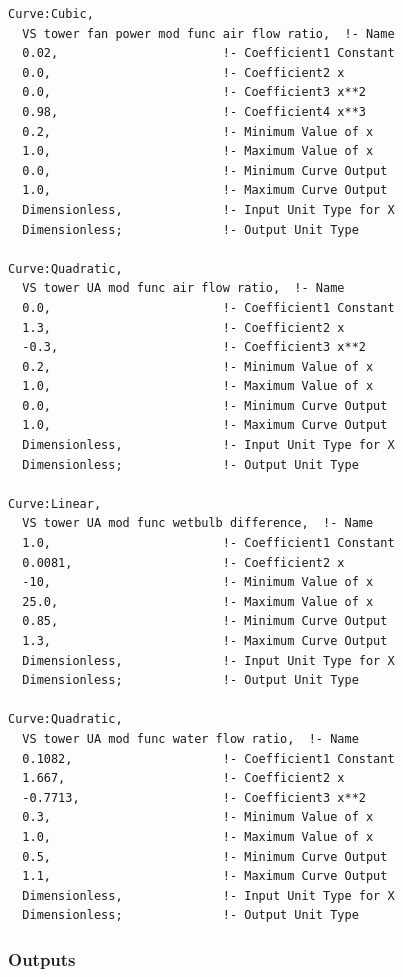 \begin{lstlisting}
Curve:Cubic,
  VS tower fan power mod func air flow ratio,  !- Name
  0.02,                       !- Coefficient1 Constant
  0.0,                        !- Coefficient2 x
  0.0,                        !- Coefficient3 x**2
  0.98,                       !- Coefficient4 x**3
  0.2,                        !- Minimum Value of x
  1.0,                        !- Maximum Value of x
  0.0,                        !- Minimum Curve Output
  1.0,                        !- Maximum Curve Output
  Dimensionless,              !- Input Unit Type for X
  Dimensionless;              !- Output Unit Type

Curve:Quadratic,
  VS tower UA mod func air flow ratio,  !- Name
  0.0,                        !- Coefficient1 Constant
  1.3,                        !- Coefficient2 x
  -0.3,                       !- Coefficient3 x**2
  0.2,                        !- Minimum Value of x
  1.0,                        !- Maximum Value of x
  0.0,                        !- Minimum Curve Output
  1.0,                        !- Maximum Curve Output
  Dimensionless,              !- Input Unit Type for X
  Dimensionless;              !- Output Unit Type

Curve:Linear,
  VS tower UA mod func wetbulb difference,  !- Name
  1.0,                        !- Coefficient1 Constant
  0.0081,                     !- Coefficient2 x
  -10,                        !- Minimum Value of x
  25.0,                       !- Maximum Value of x
  0.85,                       !- Minimum Curve Output
  1.3,                        !- Maximum Curve Output
  Dimensionless,              !- Input Unit Type for X
  Dimensionless;              !- Output Unit Type

Curve:Quadratic,
  VS tower UA mod func water flow ratio,  !- Name
  0.1082,                     !- Coefficient1 Constant
  1.667,                      !- Coefficient2 x
  -0.7713,                    !- Coefficient3 x**2
  0.3,                        !- Minimum Value of x
  1.0,                        !- Maximum Value of x
  0.5,                        !- Minimum Curve Output
  1.1,                        !- Maximum Curve Output
  Dimensionless,              !- Input Unit Type for X
  Dimensionless;              !- Output Unit Type
\end{lstlisting}

\subsubsection{Outputs}\label{outputs-2-003}

